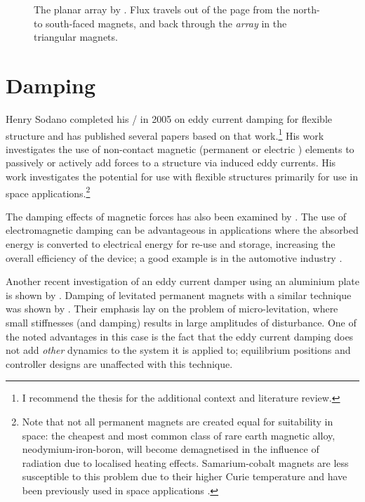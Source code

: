 \begin{figure}
   \caption[Novel planar array shown in the literature.]{%
     The planar array by \textcite{cho2001}. Flux travels out of the page
     from the north- to south-faced magnets, and back through the \emph{array}
     in the triangular magnets.}
\end{figure}



\section{Damping}

\cite{tentor2001}

Henry Sodano completed his \PhD/ in 2005 \cite{sodano2005thesis} on
eddy current damping for flexible structure and has published several
papers based on that work.\footnote{I recommend the thesis for the
  additional context and literature review.} His work investigates the
use of non-contact magnetic (permanent \cite{sodano2005,sodano2006,sodano2008} or
electric \cite{sodano2007}) elements to passively \cite{sodano2005} or
actively \cite{sodano2006,sodano2007,sodano2008} add forces to a structure via
induced eddy currents. His work investigates the potential for use
with flexible structures primarily for use in space
applications.\footnote{Note that not all permanent magnets are created
  equal for suitability in space: the cheapest and most common class
  of rare earth magnetic alloy, neodymium-iron-boron, will become
  demagnetised in the influence of radiation due to localised heating
  effects. Samarium-cobalt magnets are less susceptible to this
  problem due to their higher Curie temperature and have been
  previously used in space applications \cite{chen2005}.}

The damping effects of magnetic forces has also been examined by
\textcite{bonisoli2006}. The use of electromagnetic damping can be
advantageous in applications where the absorbed energy is converted to
electrical energy for re-use and storage, increasing the overall
efficiency of the device; a good example is in the automotive industry
\cite{graves2000thesis}. 

Another recent investigation of an eddy current damper using an aluminium
plate is shown by \textcite{ebrahimi2008}. Damping of levitated permanent
magnets with a similar technique was shown by \textcite{elbuken2006}. Their
emphasis lay on the problem of micro-levitation, where small stiffnesses (and
damping) results in large amplitudes of disturbance. One of the noted
advantages in this case is the fact that the eddy current damping does not add
\emph{other} dynamics to the system it is applied to; equilibrium positions
and controller designs are unaffected with this technique.

